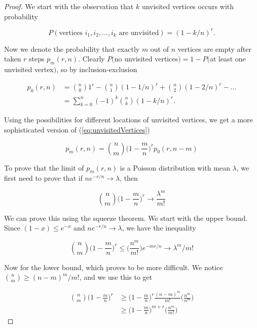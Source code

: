 \documentclass[11pt]{article}
\begin{document}
\begin{proof}
We start with the observation that $k$ unvisited vertices occurs with probability

\begin{equation}
P(\text{vertices } i_{1}, i_{2}, \ldots , i_{k} \text{ are unvisited}) = (1 - k/n)^{r}.
\label{eq:unvisitedVertices}
\end{equation}

Now we denote the probability that exactly $m$ out of $n$ vertices are empty after taken $r$ steps $p_{m}(r, n)$. Clearly $P($no unvisited vertices$) = 1 - P($at least one unvisited vertex$)$, so by inclusion-exclusion 

\begin{align}
p_{0}(r, n) &= {n \choose 0}1^{r} - {n \choose 1}(1 - 1/n)^{r} +{n \choose 2}(1 - 2/n)^{r} - \ldots \\
&= \sum_{k=0}^{n} (-1)^{k}{n \choose k}(1 - k/n)^{r}.
\label{eq:inclusionex}
\end{align}

Using the possibilities for different locations of unvisited vertices, we get a more sophisticated version of (\ref{eq:unvisitedVertices})

\begin{equation}
p_{m}(r, n) = {n \choose m}\bigg(1 - \frac{m}{n}\bigg)^{r}p_{0}(r, n - m)
\label{eq:unvisitedVertices2}
\end{equation}

To prove that the limit of $p_{m}(r, n)$ is a Poisson distribution with mean $\lambda$, we first need to prove that if $ne^{-r/n} \to \lambda$, then 

\begin{equation}
{n \choose m}\bigg(1 - \frac{m}{n}\bigg)^{r} \to \frac{\lambda^{m}}{m!}
\label{eq:squeeze}
\end{equation}

We can prove this using the squeeze theorem. We start with the upper bound. Since $(1 - x) \le e^{-x}$ and $ne^{-r/n} \to \lambda$, we have the inequality

\begin{equation}
{n \choose m}\bigg(1 - \frac{m}{n}\bigg)^{r} \le \bigg(\frac{n^{m}}{m!}\bigg)e^{-mr/n} \to \lambda^{m}/m!
\end{equation}

Now for the lower bound, which proves to be more difficult. We notice ${n \choose m} \ge (n - m)^{m}/m!$, and we use this to get

\begin{align*}
{n \choose m}\bigg(1 - \frac{m}{n}\bigg)^{r} &\ge \bigg(1 - \frac{m}{n}\bigg)^{r}\frac{(n - m)^{m}}{m!}\bigg(\frac{n^{m}}{n^{m}}\bigg) \\
&\ge \bigg(1 - \frac{m}{n}\bigg)^{m+r}\bigg(\frac{n^{m}}{m!}\bigg)
\end{align*}


\end{proof}
\end{document}
